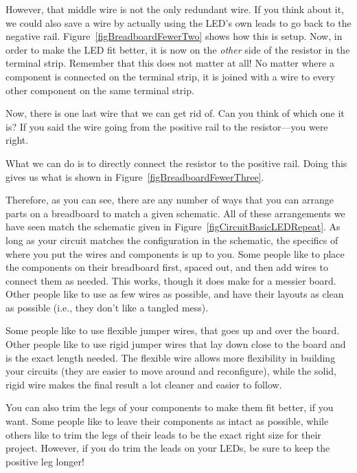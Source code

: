 However, that middle wire is not the only redundant wire.  
If you think about it, we could also save a wire by actually using the LED's own leads to go back to the negative rail.
Figure~\ref{figBreadboardFewerTwo} shows how this is setup.
Now, in order to make the LED fit better, it is now on the \emph{other} side of the resistor in the terminal strip.
Remember that this does not matter at all!
No matter where a component is connected on the terminal strip, it is joined with a wire to every other component on the same terminal strip.


Now, there is one last wire that we can get rid of.  
Can you think of which one it is?
If you said the wire going from the positive rail to the resistor---you were right.

What we can do is to directly connect the resistor to the positive rail.
Doing this gives us what is shown in Figure~\ref{figBreadboardFewerThree}.


Therefore, as you can see, there are any number of ways that you can arrange parts on a breadboard to match a given schematic.  
All of these arrangements we have seen match the schematic given in Figure~\ref{figCircuitBasicLEDRepeat}.
As long as your circuit matches the configuration in the schematic, the specifics of where you put the wires and components is up to you.
Some people like to place the components on their breadboard first, spaced out, and then add wires to connect them as needed.
This works, though it does make for a messier board.
Other people like to use as few wires as possible, and have their layouts as clean as possible (i.e., they don't like a tangled mess).

Some people like to use flexible jumper wires, that goes up and over the board.
Other people like to use rigid jumper wires that lay down close to the board and is the exact length needed.
The flexible wire allows more flexibility in building your circuits (they are easier to move around and reconfigure), while the solid, rigid wire makes the final result a lot cleaner and easier to follow.

You can also trim the legs of your components to make them fit better, if you want.
Some people like to leave their components as intact as possible, while others like to trim the legs of their leads to be the exact right size for their project.
However, if you do trim the leads on your LEDs, be sure to keep the positive leg longer!

